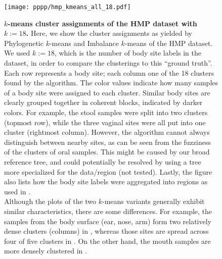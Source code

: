 \begin{figure}[hpbt]
    \centering
    \texttt{[image: pppp/hmp\_kmeans\_all\_18.pdf]}
    \begin{subfigure}{0pt}
        \label{fig:hmp_kmeans_all_18:sub:em_unconstr}
    \end{subfigure}
    \begin{subfigure}{0pt}
        \label{fig:hmp_kmeans_all_18:sub:ei_unconstr}
    \end{subfigure}
    \caption[$k$-means cluster assignments of the \ac{HMP} dataset with $k:=18$]{
        \textbf{$k$-means cluster assignments of the \ac{HMP} dataset with $k:=18$.}
        Here, we show the cluster assignments as yielded by
        Phylogenetic $k$-means  and
        Imbalance $k$-means  of the \ac{HMP} dataset.
        We used $k:=18$, which is the number of body site labels in the dataset,
        in order to compare the clusterings to this ``ground truth''.
        Each row represents a body site; each column one of the 18 clusters found by the algorithm.
        The color values indicate how many samples of a body site were assigned to each cluster.
        Similar body sites are clearly grouped together in coherent blocks, indicated by darker colors.
        For example, the stool samples were split into two clusters (topmost row),
        while the three vaginal sites were all put into one cluster (rightmost column).
        However, the algorithm cannot always distinguish between nearby sites,
        as can be seen from the fuzziness of the clusters of oral samples.
        This might be caused by our broad reference tree,
        and could potentially be resolved by using a tree more specialized for the data/region (not tested).
        Lastly, the figure also lists how the body site labels were aggregated into regions
        as used in .
        \\
        Although the plots of the two $k$-means variants generally exhibit similar characteristics,
        there are some differences.
        For example, the samples from the body surface (ear, nose, arm)
        form two relatively dense clusters (columns) in ,
        whereas those sites are spread across four of five clusters in .
        On the other hand, the mouth samples are more densely clustered in .
    }
    \label{fig:hmp_kmeans_all_18}
\end{figure}

